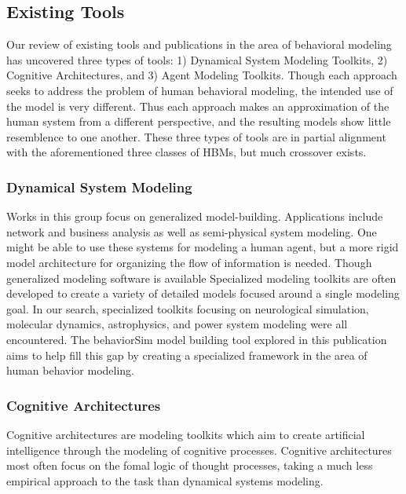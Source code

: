 \documentclass[conference]{IEEEtran}
\begin{document}

\subsection{Existing Tools}
Our review of existing tools and publications in the area of behavioral modeling has uncovered three types of tools: 1) Dynamical System Modeling Toolkits, 2) Cognitive Architectures, and 3) Agent Modeling Toolkits. 
Though each approach seeks to address the problem of human behavioral modeling, the intended use of the model is very different. 
Thus each approach makes an approximation of the human system from a different perspective, and the resulting models show little resemblence to one another.
These three types of tools are in partial alignment with the aforementioned three classes of HBMs, but much crossover exists.

\subsubsection{Dynamical System Modeling}
Works in this group focus on generalized model-building. 
Applications include network and business analysis as well as semi-physical system modeling. 
One might be able to use these systems for modeling a human agent, but a more rigid model architecture for organizing the flow of information is needed. 
Though generalized modeling software is available \cite{chen2013open, eberlein1992understanding, uhlig1995toolkit}
Specialized modeling toolkits are often developed to create a variety of detailed models focused around a single modeling goal. 
In our search, specialized toolkits focusing on neurological simulation\cite{beim2009inverse}, molecular dynamics\cite{blinov2004bionetgen, le2001stochsim}, astrophysics\cite{mcmillan2011simulations}, and power system modeling\cite{nutaro2011designing} were all encountered. 
The behaviorSim model building tool explored in this publication aims to help fill this gap by creating a specialized framework in the area of human behavior modeling.

\subsubsection{Cognitive Architectures}
Cognitive architectures\cite{gluck2006modeling} are modeling toolkits which aim to create artificial intelligence through the modeling of cognitive processes. 
Cognitive architectures most often focus on the fomal logic of thought processes, taking a much less empirical approach to the task than dynamical systems modeling.
\end{document}
